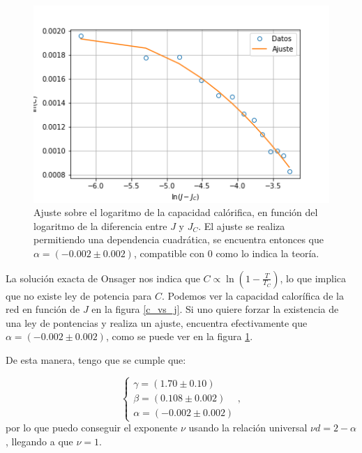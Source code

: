 \documentclass[%
 reprint,
 amsmath,amssymb,
 aps,
]{revtex4-1}
\begin{document}
\begin{figure}
  \includegraphics[width=1.0\columnwidth]{images/ajuste_alpha.png}
  \caption{Ajuste sobre el logaritmo de la capacidad cal\'orifica, en funci\'on
    del logaritmo de la diferencia entre $J$ y $J_C$. El ajuste se realiza
    permitiendo una dependencia cuadr\'atica, se encuentra entonces que $\alpha
    = (-0.002 \pm 0.002)$, compatible con $0$ como lo indica la teor\'ia.}
  \label{ajuste_alpha}
\end{figure}

La soluci\'on exacta de Onsager nos indica que $C \propto \ln (1 -
\frac{T}{T_C})$, lo que implica que no existe ley de potencia para $C$. Podemos
ver la capacidad calor\'ifica de la red en funci\'on de $J$ en la figura
\ref{c_vs_j}. Si uno quiere forzar la existencia de una ley de pontencias y
realiza un ajuste, encuentra efectivamente que $\alpha = (-0.002 \pm 0.002)$,
como se puede ver en la figura \ref{ajuste_alpha}.

De esta manera, tengo que se cumple que:

$$
\left \{
  \begin{matrix}
    \gamma = (1.70 \pm 0.10) \\
    \beta = (0.108 \pm 0.002) \\
    \alpha = (-0.002 \pm 0.002)
  \end{matrix}
\right. ,
$$
por lo que puedo conseguir el exponente $\nu$ usando la relaci\'on universal $\nu d = 2 - \alpha$, llegando a que $\nu = 1$.

\end{document}
